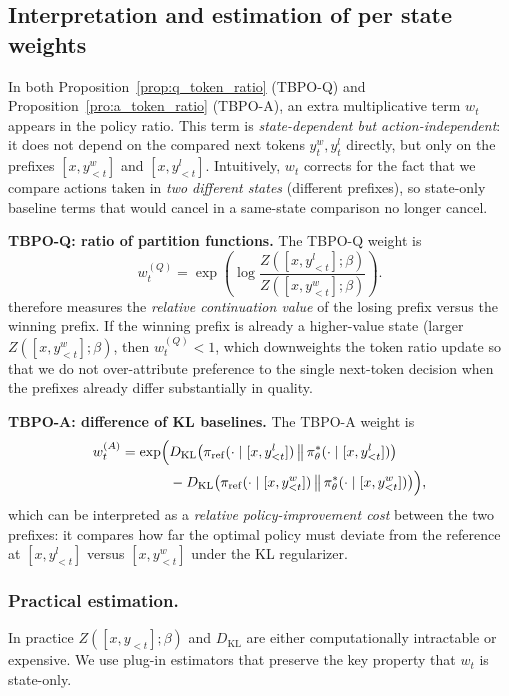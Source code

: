 \documentclass{article}
\theoremstyle{plain}
\theoremstyle{definition}
\theoremstyle{remark}
\begin{document}
\subsection{Interpretation and estimation of per state weights}
In both Proposition~\ref{prop:q_token_ratio} (TBPO-Q) and
Proposition~\ref{pro:a_token_ratio} (TBPO-A), an extra multiplicative term $w_t$
appears in the policy ratio.
This term is \emph{state-dependent but action-independent}: it does not depend on
the compared next tokens $y_t^w,y_t^l$ directly, but only on the prefixes $[x, y^w_{<t}]$ and $[x, y^l_{<t}]$.
Intuitively, $w_t$ corrects for the fact that we compare actions taken in
\emph{two different states} (different prefixes), so state-only baseline terms
that would cancel in a same-state comparison no longer cancel.

\textbf{TBPO-Q: ratio of partition functions.}
The TBPO-Q weight is
\[
w_t^{(Q)}=\exp\left(\log \frac{Z([x, y^l_{<t}]; \beta)}{Z([x, y^w_{<t}]; \beta)}\right).
\]
therefore measures the \emph{relative continuation value} of the losing prefix
versus the winning prefix.
If the winning prefix is already a higher-value state (larger $Z([x,y^w_{<t}];\beta)$, then
$w_t^{(Q)}<1$, which downweights the token ratio update so that we do not
over-attribute preference to the single next-token decision when the prefixes
already differ substantially in quality.

\textbf{TBPO-A: difference of KL baselines.}
The TBPO-A weight is
\begin{equation*}
\begin{split}
    w_t^{(A)} = \exp\Bigl( &D_{\mathrm{KL}}\bigl(\pi_{\mathrm{ref}}(\cdot\mid [x,y^l_{<t}]) \,\big\|\, \pi_{\theta}^{*}(\cdot\mid [x,y^l_{<t}])\bigr) \\
    &- D_{\mathrm{KL}}\bigl(\pi_{\mathrm{ref}}(\cdot\mid [x,y^w_{<t}]) \,\big\|\, \pi_{\theta}^{*}(\cdot\mid [x,y^w_{<t}])\bigr) \Bigr),
\end{split}
\end{equation*}
which can be interpreted as a \emph{relative policy-improvement cost} between the two
prefixes: it compares how far the optimal policy must deviate from the reference
at $[x, y^l_{<t}]$ versus $[x, y^w_{<t}]$ under the KL regularizer.



\subsubsection{Practical estimation.}
In practice $Z([x, y_{<t}]; \beta)$ and $D_{\mathrm{KL}}$ are either computationally intractable or expensive. We use plug-in estimators that preserve
the key property that $w_t$ is state-only.
\end{document}
